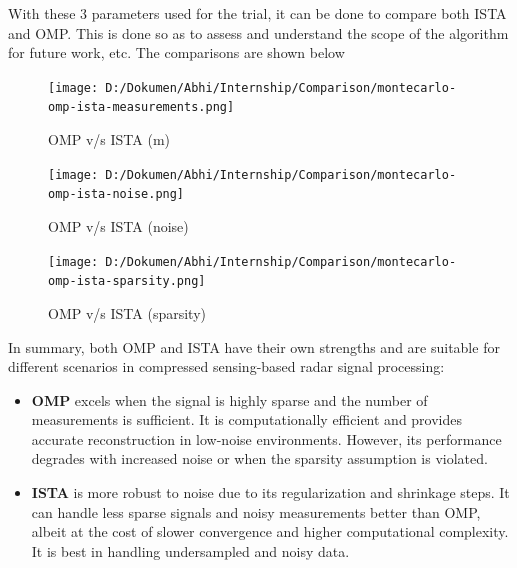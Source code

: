 \documentclass[
  letterpaper,
  DIV=11,
  numbers=noendperiod]{scrartcl}
\begin{document}
With these 3 parameters used for the trial, it can be done to compare
both ISTA and OMP. This is done so as to assess and understand the scope
of the algorithm for future work, etc. The comparisons are shown below

\begin{figure}[H]

{\centering \texttt{[image: D:/Dokumen/Abhi/Internship/Comparison/montecarlo-omp-ista-measurements.png]}

}

\caption{OMP v/s ISTA (m)}

\end{figure}%

\begin{figure}[H]

{\centering \texttt{[image: D:/Dokumen/Abhi/Internship/Comparison/montecarlo-omp-ista-noise.png]}

}

\caption{OMP v/s ISTA (noise)}

\end{figure}%

\begin{figure}[H]

{\centering \texttt{[image: D:/Dokumen/Abhi/Internship/Comparison/montecarlo-omp-ista-sparsity.png]}

}

\caption{OMP v/s ISTA (sparsity)}

\end{figure}%

In summary, both OMP and ISTA have their own strengths and are suitable
for different scenarios in compressed sensing-based radar signal
processing:

\begin{itemize}
\item
  \textbf{OMP} excels when the signal is highly sparse and the number of
  measurements is sufficient. It is computationally efficient and
  provides accurate reconstruction in low-noise environments. However,
  its performance degrades with increased noise or when the sparsity
  assumption is violated.
\item
  \textbf{ISTA} is more robust to noise due to its regularization and
  shrinkage steps. It can handle less sparse signals and noisy
  measurements better than OMP, albeit at the cost of slower convergence
  and higher computational complexity. It is best in handling
  undersampled and noisy data.
\end{itemize}
\end{document}

